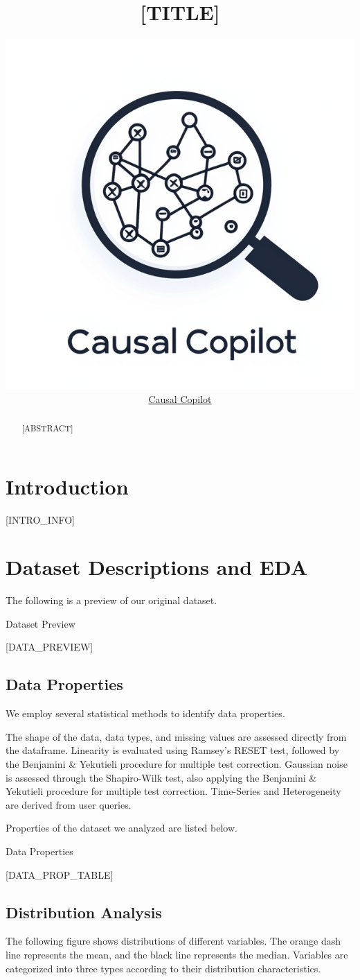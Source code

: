 \documentclass{article}
\title{[TITLE]}
\author{ \href{https://orcid.org/0000-0000-0000-0000}{\includegraphics[scale=0.06]{asset/logo.png}\hspace{1mm}Causal Copilot}}
\begin{document}
\maketitle

\begin{abstract}
[ABSTRACT]
\end{abstract}


\raggedbottom
\section{Introduction}
[INTRO_INFO]

\section{Dataset Descriptions and EDA}
The following is a preview of our original dataset.

\begin{table}[H]
    \centering
    \caption{Dataset Preview}
    [DATA_PREVIEW]
\end{table}

\subsection{Data Properties}
We employ several statistical methods to identify data properties.

The shape of the data, data types, and missing values are assessed directly from the dataframe.
Linearity is evaluated using Ramsey’s RESET test, followed by the Benjamini \& Yekutieli procedure for multiple test correction.
Gaussian noise is assessed through the Shapiro-Wilk test, also applying the Benjamini \& Yekutieli procedure for multiple test correction.
Time-Series and Heterogeneity are derived from user queries.

Properties of the dataset we analyzed are listed below.

\begin{table}[H]
    \centering
    \caption{Data Properties}
[DATA_PROP_TABLE]
\end{table}


\subsection{Distribution Analysis}
The following figure shows distributions of different variables. The orange dash line represents the mean, 
and the black line represents the median. Variables are categorized into three types according to their distribution characteristics.
\end{document}
